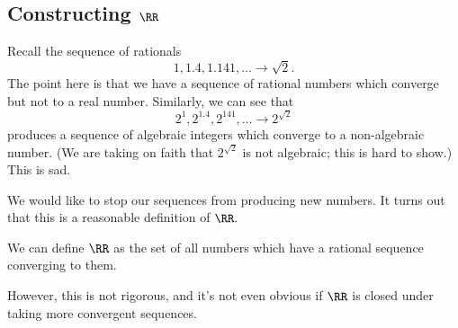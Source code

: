 








\subsection{Constructing \texorpdfstring{$\RR$}{}}
Recall the sequence of rationals
\[1,1.4,1.141,\ldots\to\sqrt2.\]
The point here is that we have a sequence of rational numbers which converge but not to a real number. Similarly, we can see that
\[2^1,2^{1.4},2^{141},\ldots\to2^{\sqrt2}\]
produces a sequence of algebraic integers which converge to a non-algebraic number. (We are taking on faith that $2^{\sqrt2}$ is not algebraic; this is hard to show.) This is sad.

We would like to stop our sequences from producing new numbers. It turns out that this is a reasonable definition of $\RR.$
\begin{defi}[Reals, I] \label{defi:real1}
    We can define $\RR$ as the set of all numbers which have a rational sequence converging to them.
\end{defi}
However, this is not rigorous, and it's not even obvious if $\RR$ is closed under taking more convergent sequences.

